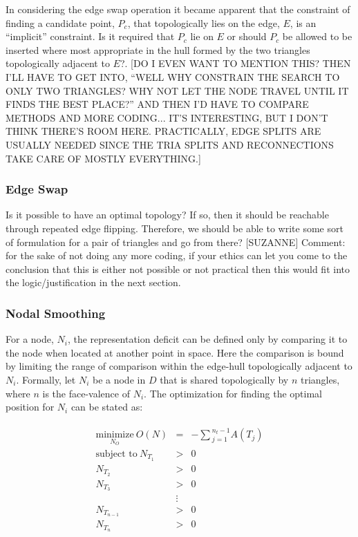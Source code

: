 In considering the edge swap operation it became apparent that the constraint of finding a candidate point, $P_c$, that topologically lies on the edge, $E$, is an ``implicit'' constraint. Is it required that $P_c$ lie on $E$ or should $P_c$ be allowed to be inserted where most appropriate in the hull formed by the two triangles topologically adjacent to $E$?. [DO I EVEN WANT TO MENTION THIS? THEN I'LL HAVE TO GET INTO, ``WELL WHY CONSTRAIN THE SEARCH TO ONLY TWO TRIANGLES? WHY NOT LET THE NODE TRAVEL UNTIL IT FINDS THE BEST PLACE?'' AND THEN I'D HAVE TO COMPARE METHODS AND MORE CODING... IT'S INTERESTING, BUT I DON'T THINK THERE'S ROOM HERE. PRACTICALLY, EDGE SPLITS ARE USUALLY NEEDED SINCE THE TRIA SPLITS AND RECONNECTIONS TAKE CARE OF MOSTLY EVERYTHING.]

\subsubsection{Edge Swap}
Is it possible to have an optimal topology? If so, then it should be
reachable through repeated edge flipping. Therefore, we should be able
to write some sort of formulation for a pair of triangles and go from
there? [SUZANNE] Comment: for the sake of not doing any more coding, if
your ethics can let you come to the conclusion that this is either not
possible or not practical then this would fit into the
logic/justification in the next section.

\subsubsection{Nodal Smoothing}
For a node, $N_i$, the representation deficit can be defined only by
comparing it to the node when located at another point in space. Here
the comparison is bound by limiting the range of comparison within the
edge-hull topologically adjacent to $N_i$. Formally, let $N_i$ be a node
in $D$ that is shared topologically by $n$ triangles, where $n$ is the
face-valence of $N_i$. The optimization for finding the optimal position
for $N_i$ can be stated as:

\begin{eqnarray*}
\begin{array}{rcl}
\underset{N_O}{\text{minimize}} \ O(N) & = &
-\sum{_{j=1}^{n_t-1}A\left(T_j\right)} \\
\text{subject to} \ N_{T_1} & > & 0 \\
N_{T_2} & > & 0 \\ 
N_{T_3} & > & 0 \\
& \vdots & \\
N_{T_{n-1}} & > & 0 \\ 
N_{T_n} & > & 0
\end{array}
\end{eqnarray*}

